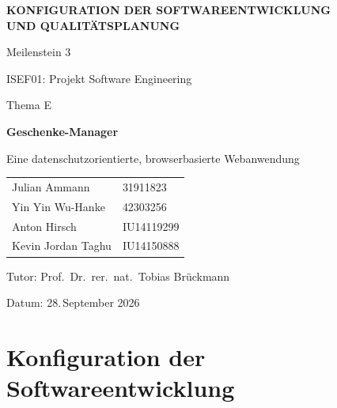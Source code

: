 \documentclass[11pt,a4paper]{article}
\begin{document}
\begin{titlepage}
\thispagestyle{empty}
\centering
\vspace*{2.5cm}

{\LARGE\bfseries KONFIGURATION DER SOFTWAREENTWICKLUNG\\[0.2cm] UND QUALITÄTSPLANUNG\par}
\vspace{0.6cm}
{\Large Meilenstein 3\par}
\vspace{1.2cm}

{\Large ISEF01: Projekt Software Engineering\par}
\vspace{1.5cm}

{\large Thema E\par}
\vspace{0.2cm}
{\Large\bfseries Geschenke-Manager\par}
\vspace{0.3cm}
{\large Eine datenschutzorientierte, browserbasierte Webanwendung\par}

\vfill

{\large
\begin{tabular}{@{}ll@{}}
Julian Ammann & 31911823 \\
Yin Yin Wu-Hanke & 42303256 \\
Anton Hirsch & IU14119299 \\
Kevin Jordan Taghu & IU14150888 \\
\end{tabular}\par}

\vspace{1.0cm}
{\large
Tutor: Prof.\ Dr.\ rer.\ nat.\ Tobias Brückmann\par
Datum: 28.\,September 2026
\par}

\end{titlepage}

\setcounter{page}{1}

\tableofcontents

\clearpage
{}

\section{Konfiguration der Softwareentwicklung}
\end{document}
